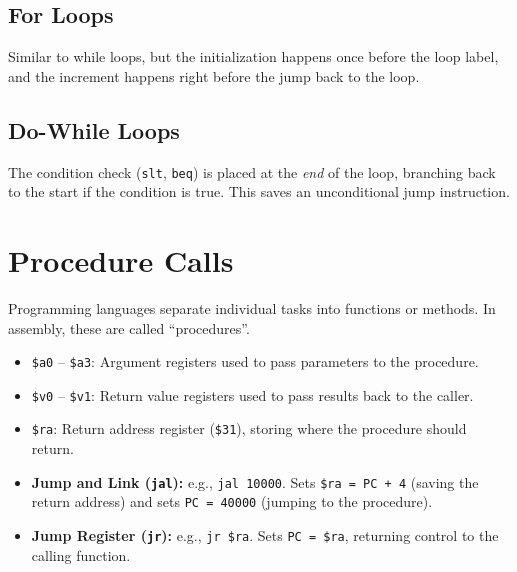 \subsection{For Loops}
Similar to while loops, but the initialization happens once before the loop label, and the increment happens right before the jump back to the loop.

\subsection{Do-While Loops}
The condition check (\texttt{slt}, \texttt{beq}) is placed at the \textit{end} of the loop, branching back to the start if the condition is true. This saves an unconditional jump instruction.

\section{Procedure Calls}

Programming languages separate individual tasks into functions or methods. In assembly, these are called ``procedures''.

\begin{vocabulary}

\begin{itemize}
    \item \texttt{\$a0} -- \texttt{\$a3}: Argument registers used to pass parameters to the procedure.
    \item \texttt{\$v0} -- \texttt{\$v1}: Return value registers used to pass results back to the caller.
    \item \texttt{\$ra}: Return address register (\texttt{\$31}), storing where the procedure should return.
\end{itemize}
\end{vocabulary}

\begin{definition}

\begin{itemize}
    \item \textbf{Jump and Link (\texttt{jal}):} e.g., \texttt{jal 10000}. Sets \texttt{\$ra = PC + 4} (saving the return address) and sets \texttt{PC = 40000} (jumping to the procedure).
    \item \textbf{Jump Register (\texttt{jr}):} e.g., \texttt{jr \$ra}. Sets \texttt{PC = \$ra}, returning control to the calling function.
\end{itemize}
\end{definition}

